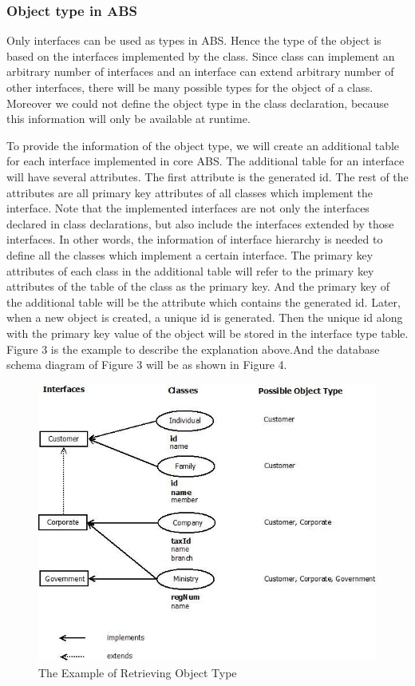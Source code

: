\documentclass[runningheads,a4paper]{llncs}
\begin{document}
\subsubsection{Object type in ABS}
Only interfaces can be used as types in ABS. Hence the type of the object is based on the interfaces implemented by the class. Since class can implement an arbitrary number of interfaces and an interface can extend arbitrary number of other interfaces, there will be many possible types for the object of a class. Moreover we could not define the object type in the class declaration, because this information will only be available at runtime.

To provide the information of the object type, we will create an additional table for each interface implemented in core ABS. The additional table for an interface will have several attributes. The first attribute is the generated id. The rest of the attributes are all primary key attributes of all classes which implement the interface. Note that the implemented interfaces are not only the interfaces declared in class declarations, but also include the interfaces extended by those interfaces. In other words, the information of interface hierarchy is needed to define all the classes which implement a certain interface. The primary key attributes of each class in the additional table will refer to the primary key attributes of the table of the class as the primary key. And the primary key of the additional table will be the attribute which contains the generated id. Later, when a new object is created, a unique id is generated. Then the unique id along with the primary key value of the object will be stored in the interface type table. Figure 3 is the example to describe the explanation above.And the database schema diagram of Figure 3 will be as shown in Figure 4.

\begin{figure}
	\centering
	\includegraphics[scale=0.6]{sample.jpg}
	\caption{The Example of Retrieving Object Type}
	\label{sample}
\end{figure}
\end{document}
